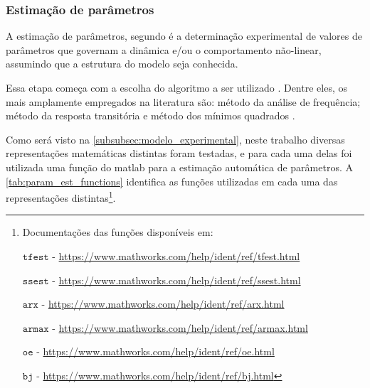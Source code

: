 \subsubsection{Estimação de parâmetros}
\label{subsubsec:estimacao_de_parametros}

A estimação de parâmetros, segundo  é a determinação experimental
de valores de parâmetros que governam a dinâmica e/ou o comportamento não-linear, assumindo que a
estrutura do modelo seja conhecida.

Essa etapa começa com a escolha do algoritmo a ser utilizado \cite{Aguirre2015}. Dentre eles, os
mais amplamente empregados na literatura são: método da análise de frequência; método da resposta
transitória e método dos mínimos quadrados \cite{Favaro2012}.

Como será visto na \cref{subsubsec:modelo_experimental}, neste trabalho diversas representações matemáticas
distintas foram testadas, e para cada uma delas foi utilizada uma função do \acrshort{matlab} para 
a estimação automática de parâmetros. A \cref{tab:param_est_functions} identifica as funções
utilizadas em cada uma das representações distintas\footnote{
    Documentações das funções disponíveis em:

    $\mathtt{tfest}$ - \url{https://www.mathworks.com/help/ident/ref/tfest.html}

    $\mathtt{ssest}$ - \url{https://www.mathworks.com/help/ident/ref/ssest.html}

    $\mathtt{arx}$ - \url{https://www.mathworks.com/help/ident/ref/arx.html}

    $\mathtt{armax}$ - \url{https://www.mathworks.com/help/ident/ref/armax.html}

    $\mathtt{oe}$ - \url{https://www.mathworks.com/help/ident/ref/oe.html}

    $\mathtt{bj}$ - \url{https://www.mathworks.com/help/ident/ref/bj.html}
}.


